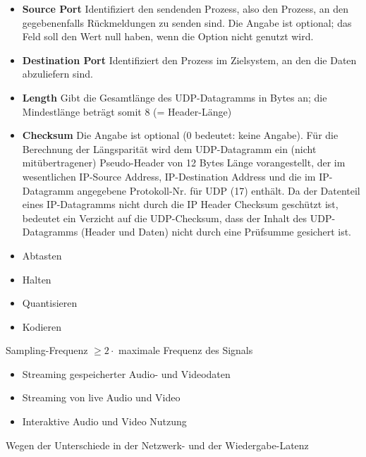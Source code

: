 \begin{itemize}
    \item \textbf{Source Port} Identifiziert den sendenden Prozess, also den Prozess, an den gegebenenfalls Rückmeldungen zu senden sind. Die Angabe ist optional; das Feld soll den Wert null haben, wenn die Option nicht genutzt wird.
    \item \textbf{Destination Port} Identifiziert den Prozess im Zielsystem, an den die Daten abzuliefern sind.
    \item \textbf{Length} Gibt die Gesamtlänge des UDP-Datagramms in Bytes an;
    die Mindestlänge beträgt somit 8 (= Header-Länge)
    \item \textbf{Checksum} Die Angabe ist optional (0 bedeutet: keine Angabe).
    Für die Berechnung der Längsparität wird dem UDP-Datagramm ein (nicht mitübertragener) Pseudo-Header von 12 Bytes Länge vorangestellt, der im wesentlichen IP-Source Address, IP-Destination Address und die im IP-Datagramm angegebene Protokoll-Nr. für UDP (17) enthält. Da der Datenteil eines IP-Datagramms nicht durch die IP Header Checksum geschützt ist, bedeutet ein Verzicht auf die UDP-Checksum, dass der Inhalt des UDP-Datagramms (Header und Daten) nicht durch eine Prüfsumme gesichert ist.
\end{itemize}

\begin{itemize}
    \item Abtasten
    \item Halten
    \item Quantisieren
    \item Kodieren
\end{itemize}

Sampling-Frequenz $\ge 2 \cdot$ maximale Frequenz des Signals

\begin{itemize}
    \item Streaming gespeicherter Audio- und Videodaten
    \item Streaming von live Audio und Video
    \item Interaktive Audio und Video Nutzung
\end{itemize}

Wegen der Unterschiede in der Netzwerk- und der Wiedergabe-Latenz

